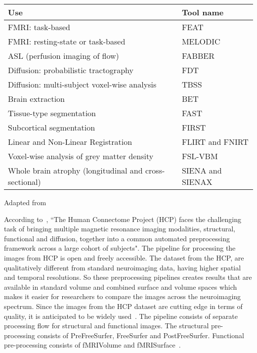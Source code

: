\begin{center}
\tabulinesep=1.2mm
\begin{tabu} to \textwidth { | X[l] | X[l] | }
  \hline
  Use & Tool name \\
  \hline
  FMRI: task-based & FEAT \\
  \hline
  FMRI: resting-state or task-based & MELODIC \\
  \hline
  ASL (perfusion imaging of flow) & FABBER \\
  \hline
  Diffusion: probabilistic tractography & FDT \\
  \hline
  Diffusion: multi-subject voxel-wise analysis & TBSS \\
  \hline
  Brain extraction & BET \\
  \hline
  Tissue-type segmentation  & FAST \\
  \hline
  Subcortical segmentation & FIRST \\
  \hline
  Linear and Non-Linear Registration & FLIRT and FNIRT \\
  \hline
  Voxel-wise analysis of grey matter density & FSL-VBM \\
  \hline
  Whole brain atrophy (longitudinal and cross-sectional) & SIENA and SIENAX \\
  \hline
\end{tabu}
\label{tab:tools_fsl}
\caption*{Adapted from \cite{JENKINSON2012782}}
\end{center}

According to~\cite{Gla13}, ``The Human Connectome Project (HCP) faces the challenging task of bringing multiple magnetic resonance imaging modalities, structural, functional and diffusion, together into a common automated preprocessing framework across a large cohort of subjects". The pipeline for processing the images from HCP is open and freely accessible. The dataset from the HCP, are qualitatively different from standard neuroimaging data, having higher spatial and temporal resolutions. So these preprocessing pipelines creates results that are available in standard volume and combined surface and volume spaces which makes it easier for researchers to compare the images across the neuroimaging spectrum. Since the images from the HCP dataset are cutting edge in terms of quality, it is anticipated to be widely used~\cite{HODGE20161102}. The pipeline consists of separate processing flow for structural and functional images. The structural pre-processing consists of PreFreeSurfer, FreeSurfer and PostFreeSurfer. Functional pre-processing consists of fMRIVolume and fMRISurface~\cite{FSL}.

